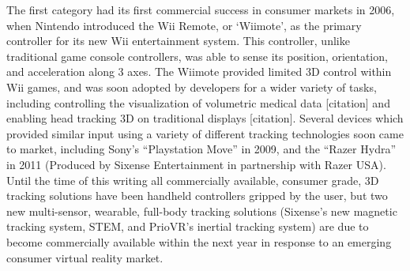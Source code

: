 The first category had its first commercial success in consumer markets in 2006, when Nintendo introduced the Wii Remote, or ‘Wiimote’, as the primary controller for its new Wii entertainment system. This controller, unlike traditional game console controllers, was able to sense its position, orientation, and acceleration along 3 axes. The Wiimote provided limited 3D control within Wii games, and was soon adopted by developers for a wider variety of tasks, including controlling the visualization of volumetric medical data [citation] and enabling head tracking 3D on traditional displays [citation]. Several devices which provided similar input using a variety of different tracking technologies soon came to market, including Sony’s “Playstation Move” in 2009, and the “Razer Hydra” in 2011 (Produced by Sixense Entertainment in partnership with Razer USA). Until the time of this writing all commercially available, consumer grade, 3D tracking solutions have been handheld controllers gripped by the user, but two new multi-sensor, wearable, full-body tracking solutions (Sixense’s new magnetic tracking system, STEM, and PrioVR’s inertial tracking system) are due to become commercially available within the next year in response to an emerging consumer virtual reality market.
 
